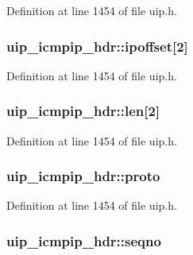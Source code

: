 Definition at line 1454 of file uip.h.

\hypertarget{structuip__icmpip__hdr_a4619e69ec86a47f6abe945b39ec7f63a}{
\subsubsection[{ipoffset}]{ {\bf uip\_\-icmpip\_\-hdr::ipoffset}\mbox{[}2\mbox{]}}}
\label{structuip__icmpip__hdr_a4619e69ec86a47f6abe945b39ec7f63a}


Definition at line 1454 of file uip.h.

\hypertarget{structuip__icmpip__hdr_ab15853725b233d526b291db0347d4ecd}{
\subsubsection[{len}]{ {\bf uip\_\-icmpip\_\-hdr::len}\mbox{[}2\mbox{]}}}
\label{structuip__icmpip__hdr_ab15853725b233d526b291db0347d4ecd}


Definition at line 1454 of file uip.h.

\hypertarget{structuip__icmpip__hdr_a55e7764a9f6ed05aaa98076b9f6770a5}{
\subsubsection[{proto}]{ {\bf uip\_\-icmpip\_\-hdr::proto}}}
\label{structuip__icmpip__hdr_a55e7764a9f6ed05aaa98076b9f6770a5}


Definition at line 1454 of file uip.h.

\hypertarget{structuip__icmpip__hdr_a967def494c68cfc8a08d5a6c4dbbc25d}{
\subsubsection[{seqno}]{ {\bf uip\_\-icmpip\_\-hdr::seqno}}}
\label{structuip__icmpip__hdr_a967def494c68cfc8a08d5a6c4dbbc25d}


